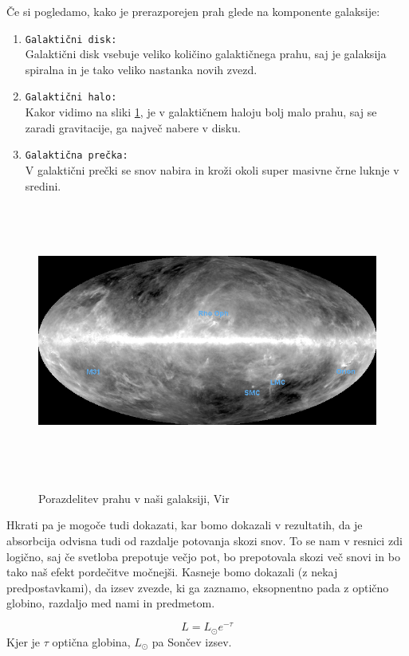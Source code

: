 \documentclass[12pt, a4paper]{article}
\begin{document}
Če si pogledamo, kako je prerazporejen prah glede na komponente galaksije:
\begin{enumerate}
    \item \texttt{Galaktični disk:}\\
    Galaktični disk vsebuje veliko količino galaktičnega prahu, saj je galaksija spiralna in je tako veliko nastanka novih zvezd. 
    \item \texttt{Galaktični halo:}\\
    Kakor vidimo na sliki \ref{fig:Galaxydust}, je v galaktičnem haloju bolj malo prahu, saj se zaradi gravitacije, ga največ nabere v disku. 
    \item \texttt{Galaktična prečka:}\\
    V galaktični prečki se snov nabira in kroži okoli super masivne črne luknje v sredini. 
\end{enumerate}

\begin{figure}[H]
    \centering
    \includegraphics[width=15cm, height=9cm]{Prah.jpg}
    \label{fig:Galaxydust}
    \caption{Porazdelitev prahu v naši galaksiji, Vir \cite{Galaxydust}}
\end{figure}
Hkrati pa je mogoče tudi dokazati, kar bomo dokazali v rezultatih, da je absorbcija odvisna tudi od razdalje potovanja skozi snov. To se nam v resnici zdi logično, saj če svetloba prepotuje večjo pot, bo prepotovala skozi več snovi in bo tako naš efekt pordečitve močnejši. Kasneje bomo dokazali (z nekaj predpostavkami), da izsev zvezde, ki ga zaznamo, eksopnentno pada z optično globino, razdaljo med nami in predmetom.\cite{opticna}

\begin{equation} \label{eq:Eq1}
	   L=L_{\odot}e^{-\tau}
		\end{equation}
Kjer je $\tau$ optična globina, $L_{\odot}$ pa Sončev izsev.
\end{document}
